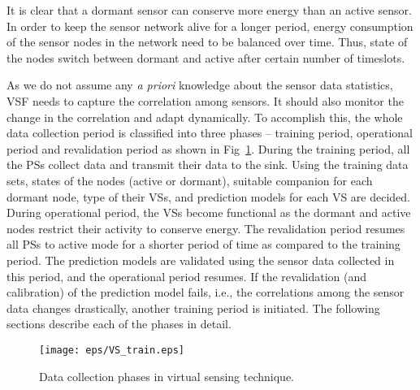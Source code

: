 \documentclass[a4paper,conference]{IEEEtran}
\begin{document}
It is clear that a dormant sensor can conserve more energy than an active sensor. In order to keep the sensor network alive for a longer period, energy consumption of the sensor nodes in the network need to be balanced over time.  Thus, state of the nodes switch between dormant and active after certain number of timeslots. 

As we do not assume any \textit{a priori} knowledge about the sensor data statistics, VSF needs to capture the correlation among sensors. It should also monitor the change in the correlation and adapt dynamically. To accomplish this, the whole data collection period is classified into three phases -- training period, operational period and revalidation period as shown in Fig~\ref{fig:vs_train}. During the training period, all the PSs collect data and transmit their data to the sink. Using the training data sets, states of the nodes (active or dormant), suitable companion for each dormant node, type of their VSs, and prediction models for each VS are decided. During operational period, the VSs become functional as the dormant and active nodes restrict their activity to conserve energy. The revalidation period resumes all PSs to active mode for a shorter period of time as compared to the training period. The prediction models are validated using the sensor data collected in this period, and the operational period resumes. If the revalidation (and calibration) of the prediction model fails, i.e., the correlations among the sensor data changes drastically, another training period is initiated. The following sections describe each of the phases in detail.
\begin{figure}
\centering
\texttt{[image: eps/VS\_train.eps]}
\caption{Data collection phases in virtual sensing technique.}
\label{fig:vs_train}
\end{figure}
\end{document}
